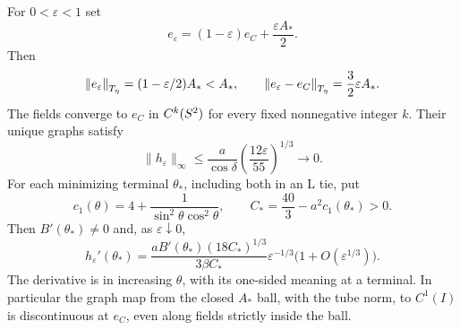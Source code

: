 \documentclass[11pt,a4paper]{article}
\begin{document}
\begin{theorem}
\label{thm:degeneration}
For $0<\varepsilon<1$ set
\begin{equation}\label{eq:efamily}
 e_\varepsilon=(1-\varepsilon)e_C+\frac{\varepsilon A_*}{2}.
\end{equation}
Then
\begin{equation}\label{eq:familynorms}
 \left\lVert e_\varepsilon\right\rVert_{T_\eta}=(1-\varepsilon/2)A_*<A_*,\qquad
 \left\lVert e_\varepsilon-e_C\right\rVert_{T_\eta}=\frac32\varepsilon A_*.
\end{equation}
The fields converge to $e_C$ in $C^k(S^2)$ for every fixed
nonnegative integer $k$. Their unique graphs satisfy
\begin{equation}\label{eq:graphconvergence}
 \|h_\varepsilon\|_\infty\le
 \frac{a}{\cos\delta}\left(\frac{12\varepsilon}{55}\right)^{1/3}
 \longrightarrow0.
\end{equation}
For each minimizing terminal $\theta_*$, including both in an L tie,
put
\[
 c_1(\theta)=4+\frac{1}{\sin^2\theta\cos^2\theta},\qquad
 C_*=\frac{40}{3}-a^2c_1(\theta_*)>0.
\]
Then $B'(\theta_*)\ne0$ and, as $\varepsilon\downarrow0$,
\begin{equation}\label{eq:slopedegeneration}
 h_\varepsilon'(\theta_*)=
 \frac{aB'(\theta_*)(18C_*)^{1/3}}{3\beta C_*}
 \varepsilon^{-1/3}\bigl(1+O(\varepsilon^{1/3})\bigr).
\end{equation}
The derivative is in increasing $\theta$, with its one-sided meaning
at a terminal. In particular the graph map from the closed
$A_*$ ball, with the tube norm, to $C^1(I)$ is discontinuous at $e_C$,
even along fields strictly inside the ball.
\end{theorem}
\end{document}
